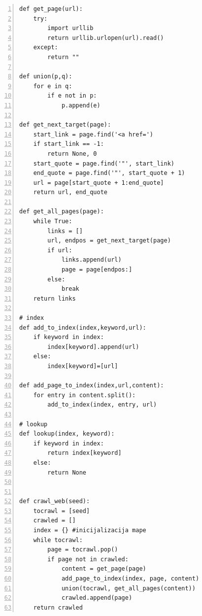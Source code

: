 \begin{lstlisting}[caption=Мапа уместо листе, label={lst:dictionary}, numbers=left]
def get_page(url):
    try:
        import urllib
        return urllib.urlopen(url).read()
    except:
        return ""

def union(p,q):
    for e in q:
        if e not in p:
            p.append(e)

def get_next_target(page):
    start_link = page.find('<a href=')
    if start_link == -1:
        return None, 0
    start_quote = page.find('"', start_link)
    end_quote = page.find('"', start_quote + 1)
    url = page[start_quote + 1:end_quote]
    return url, end_quote

def get_all_pages(page):
    while True:
        links = []
        url, endpos = get_next_target(page)
        if url:
            links.append(url)
            page = page[endpos:]
        else:
            break
    return links

# index
def add_to_index(index,keyword,url):
    if keyword in index:
        index[keyword].append(url)
    else:
        index[keyword]=[url]

def add_page_to_index(index,url,content):
    for entry in content.split():
        add_to_index(index, entry, url)

# lookup
def lookup(index, keyword):
    if keyword in index:
        return index[keyword]
    else:
        return None


def crawl_web(seed):
    tocrawl = [seed]
    crawled = []
    index = {} #inicijalizacija mape
    while tocrawl:
        page = tocrawl.pop()
        if page not in crawled:
            content = get_page(page)
            add_page_to_index(index, page, content)
            union(tocrawl, get_all_pages(content))
            crawled.append(page)
    return crawled
\end{lstlisting}

